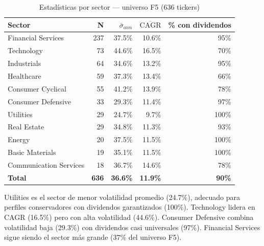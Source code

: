 \begin{table}[H]
  \centering
  \caption{Estadísticas por sector --- universo F5 (636 tickers)}
  \label{tab:sectorstats}
  \begin{tabular}{lrrrr}
    \toprule
    \textbf{Sector} & \textbf{N} & \textbf{$\bar{\sigma}_{ann}$}
                    & \textbf{$\overline{\text{CAGR}}$} & \textbf{\% con dividendos} \\
    \midrule
    Financial Services     & 237 & 37.5\% & 10.6\% & 95\% \\
    Technology             &  73 & 44.6\% & 16.5\% & 70\% \\
    Industrials            &  64 & 34.6\% & 13.2\% & 95\% \\
    Healthcare             &  59 & 37.3\% & 13.4\% & 66\% \\
    Consumer Cyclical      &  55 & 41.2\% & 13.9\% & 78\% \\
    Consumer Defensive     &  33 & 29.3\% & 11.4\% & 97\% \\
    Utilities              &  29 & 24.7\% &  9.7\% & 100\% \\
    Real Estate            &  29 & 34.8\% & 11.3\% & 93\% \\
    Energy                 &  20 & 37.5\% & 11.5\% & 100\% \\
    Basic Materials        &  19 & 35.1\% & 11.5\% & 100\% \\
    Communication Services &  18 & 36.7\% & 14.6\% & 78\% \\
    \midrule
    \textbf{Total}         & \textbf{636} & \textbf{36.6\%} & \textbf{11.9\%} & \textbf{90\%} \\
    \bottomrule
  \end{tabular}
\end{table}

Utilities es el sector de menor volatilidad promedio (24.7\%), adecuado
para perfiles conservadores con dividendos garantizados (100\%).
Technology lidera en CAGR (16.5\%) pero con alta volatilidad (44.6\%).
Consumer Defensive combina volatilidad baja (29.3\%) con dividendos casi
universales (97\%). Financial Services sigue siendo el sector más grande
(37\% del universo F5).

